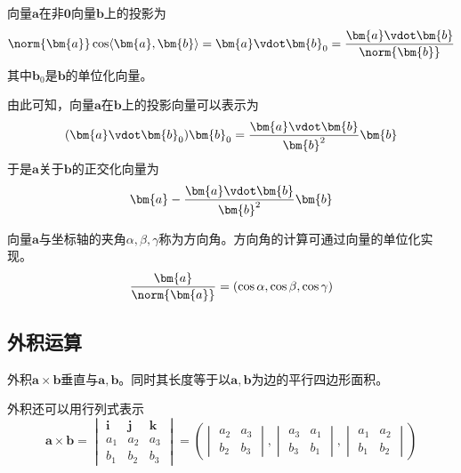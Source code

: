 向量$\bm{a}$在非$\bm{0}$向量$\bm{b}$上的投影为
\begin{equation}
    \norm{\bm{a}}\cos\langle\bm{a},\bm{b}\rangle = \bm{a}\vdot\bm{b}_0 = \frac{\bm{a}\vdot\bm{b}}{\norm{\bm{b}}}
\end{equation}
其中$\bm{b}_0$是$\bm{b}$的单位化向量。

由此可知，向量$\bm{a}$在$\bm{b}$上的投影向量可以表示为
\begin{equation}
    (\bm{a}\vdot\bm{b}_0)\bm{b}_0 = \frac{\bm{a}\vdot\bm{b}}{\bm{b}^2}\bm{b}
\end{equation}
于是$\bm{a}$关于$\bm{b}$的正交化向量为
\begin{equation}
    \bm{a} - \frac{\bm{a}\vdot\bm{b}}{\bm{b}^2}\bm{b}
\end{equation}

向量$\bm{a}$与坐标轴的夹角$\alpha,\beta,\gamma$称为方向角。方向角的计算可通过向量的单位化实现。
\begin{equation}
    \frac{\bm{a}}{\norm{\bm{a}}} = (\cos\alpha,\cos\beta,\cos\gamma)
\end{equation}

\subsection{外积运算}
外积$\bm{a}\times\bm{b}$垂直与$\bm{a},\bm{b}$。同时其长度等于以$\bm{a},\bm{b}$为边的平行四边形面积。

外积还可以用行列式表示
\begin{equation}
    \bm{a}\times\bm{b} =
    \begin{vmatrix}
        \bm{i} & \bm{j} & \bm{k} \\
        a_1    & a_2    & a_3    \\
        b_1    & b_2    & b_3
    \end{vmatrix}
    =
    \left(
    \begin{vmatrix}
            a_2 & a_3 \\
            b_2 & b_3
        \end{vmatrix},
    \begin{vmatrix}
            a_3 & a_1 \\
            b_3 & b_1
        \end{vmatrix},
    \begin{vmatrix}
            a_1 & a_2 \\
            b_1 & b_2
        \end{vmatrix}
    \right)
\end{equation}

